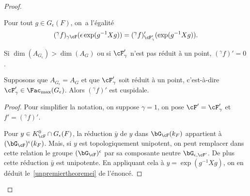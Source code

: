 \begin{proof}
\skpt
\begin{lem*}
\begin{enumeratei}
\item\label{unpremiertheoremei}
Pour tout $g\in G_{\epsilon}(F)$, on~a l'égalité
\[
(^{\gamma}f)_{\gamma\cF}(\epsilon \exp(g^{-1} Xg))=(^{\gamma}f)'_{\cF_{\gamma}'}(\exp(g^{-1}Xg)).
\]

\item\label{unpremiertheoremeii}
Si $\dim(A_{G_{\epsilon}})> \dim(A_{G})$ ou si $\cF'_{\gamma}$ n'est pas réduit à un point, $ (^{\gamma}f)'=0$.

\item\label{unpremiertheoremeiii}
Supposons que $A_{G_{\epsilon}}=A_{G}$ et que $\cF'_{\gamma}$ soit réduit à un point, c'est-à-dire $\cF_{\gamma}'\in \Fac_{\max}(G_{\epsilon})$. Alors $(^{\gamma}f)'$ est cuspidale.
\end{enumeratei}
\end{lem*}

\begin{proof}
Pour simplifier la notation, on suppose $\gamma=1$, on pose $\cF'=\cF'_{\gamma}$ et $f'=(^{\gamma}f)'$.

Pour $y\in K_{\cF}^0\cap G_{\epsilon}(F)$, la réduction $\bar{y}$ de $y$ dans $\bG_{\cF}(k_{F})$ appartient à $(\bG_{\cF})^{\epsilon}(k_{F})$. Mais, si $y$ est topologiquement unipotent, on peut remplacer dans cette relation le groupe $(\bG_{\cF})^{\epsilon}$ par sa composante neutre $\bG_{\epsilon,\cF'}$. De plus cette réduction $\bar{y}$ est unipotente. En appliquant cela à $y=\exp(g^{-1}Xg)$, on en déduit le~\eqref{unpremiertheoremei} de l'énoncé.


\end{proof}
\end{proof}
